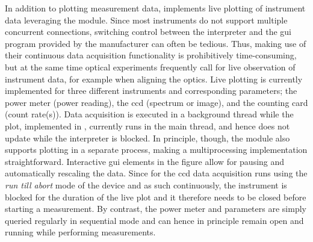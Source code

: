 In addition to plotting measurement data, \mjolnir implements live plotting of instrument data leveraging the  module.
Since most instruments do not support multiple concurrent connections, switching control between the \python interpreter and the \gls{gui} program provided by the manufacturer can often be tedious.
Thus, making use of their continuous data acquisition functionality is prohibitively time-consuming, but at the same time optical experiments frequently call for live observation of instrument data, for example when aligning the optics.
Live plotting is currently implemented for three different instruments and corresponding parameters; the \thorlabspowermeter power meter (power reading), the \theccd \gls{ccd} (spectrum or image), and the \tagger counting card (count rate(s)).
Data acquisition is executed in a background thread while the plot, implemented in \matplotlib, currently runs in the main thread, and hence does not update while the interpreter is blocked.
In principle, though, the  module also supports plotting in a separate process, making a multiprocessing implementation straightforward.
Interactive \gls{gui} elements in the \matplotlib figure allow for pausing and automatically rescaling the data.
Since for the \gls{ccd} data acquisition runs using the \emph{run till abort} mode of the device and as such continuously, the instrument is blocked for the duration of the live plot and it therefore needs to be closed before starting a measurement.
By contrast, the power meter and \taggershort parameters are simply queried regularly in sequential mode and can hence in principle remain open and running while performing measurements.